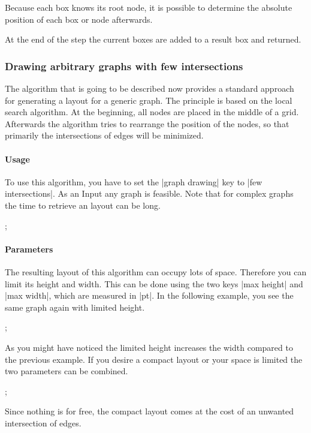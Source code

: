 Because each box knows its root node, it is possible to determine the absolute position of each box or node afterwards. 

At the end of the step the current boxes are added to a result box and returned.

\subsubsection{Drawing arbitrary graphs with few intersections}
The algorithm that is going to be described now provides a standard approach for generating a layout for a generic graph.
The principle is based on the local search algorithm. At the beginning, all nodes are placed in the middle of a grid.
Afterwards the algorithm tries to rearrange the position of the nodes, so that primarily the intersections of edges will be minimized.

\paragraph{Usage}
To use this algorithm, you have to set the |graph drawing| key to |few intersections|. As an Input any graph is feasible. Note that for complex graphs the time to retrieve an layout can be long.

\begin{codeexample}[]
\tikzpicture [graph drawing={few intersections}, scale=2]
  ;
\endtikzpicture
\end{codeexample}

\paragraph{Parameters}
The resulting layout of this algorithm can occupy lots of space. Therefore you can limit its height and width.
This can be done using the two keys |max height| and |max width|, which are measured in |pt|. In the following example, you see the same graph again with limited height.
\begin{codeexample}[]
\tikzpicture [graph drawing={few intersections, max height=50}, scale=2]
  ;
\endtikzpicture
\end{codeexample}
As you might have noticed the limited height increases the width compared to the previous example.
If you desire a compact layout or your space is limited the two parameters can be combined.
\begin{codeexample}[]
\tikzpicture [graph drawing={few intersections, max width=50, max height=50},
              scale=2]
  ;
\endtikzpicture
\end{codeexample}
Since nothing is for free, the compact layout comes at the cost of an unwanted intersection of edges.

